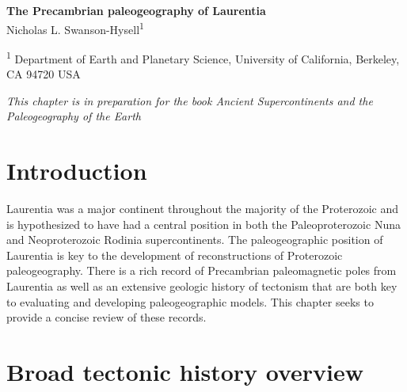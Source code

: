 \documentclass[11pt,letterpaper]{article}
\begin{document}
\begin{flushleft}
{\Large \textbf{The Precambrian paleogeography of Laurentia}}
\\

Nicholas L. Swanson-Hysell\textsuperscript{1}

\bigskip

\textsuperscript{1} Department of Earth and Planetary Science, University of California, Berkeley, CA 94720 USA

\end{flushleft}

\noindent\textit{This chapter is in preparation for the book Ancient Supercontinents and the Paleogeography of the Earth}

\linenumbers

\section*{Introduction}

Laurentia was a major continent throughout the majority of the Proterozoic and is hypothesized to have had a central position in both the Paleoproterozoic Nuna and Neoproterozoic Rodinia supercontinents. The paleogeographic position of Laurentia is key to the development of reconstructions of Proterozoic paleogeography. There is a rich record of Precambrian paleomagnetic poles from Laurentia as well as an extensive geologic history of tectonism that are both key to evaluating and developing paleogeographic models. This chapter seeks to provide a concise review of these records.

\section*{Broad tectonic history overview}
\end{document}
